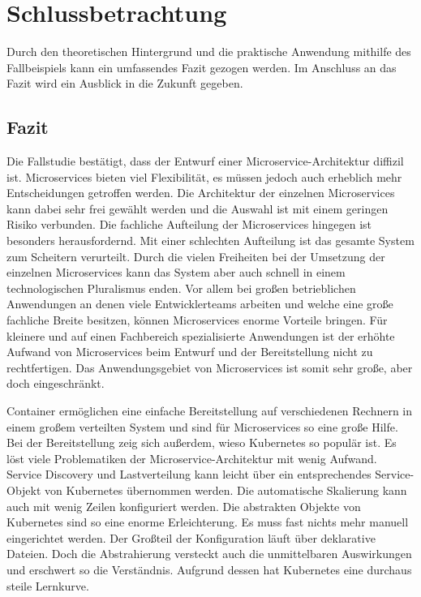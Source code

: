 \section{Schlussbetrachtung}

Durch den theoretischen Hintergrund und die praktische Anwendung mithilfe des Fallbeispiels kann ein umfassendes Fazit gezogen werden. Im Anschluss an das Fazit wird ein Ausblick in die Zukunft gegeben.

\subsection{Fazit}
Die Fallstudie bestätigt, dass der Entwurf einer Microservice-Architektur diffizil ist. Microservices bieten viel Flexibilität, es müssen jedoch auch erheblich mehr Entscheidungen getroffen werden. Die Architektur der einzelnen Microservices kann dabei sehr frei gewählt werden und die Auswahl ist mit einem geringen Risiko verbunden. Die fachliche Aufteilung der Microservices hingegen ist besonders herausfordernd. Mit einer schlechten Aufteilung ist das gesamte System zum Scheitern verurteilt. Durch die vielen Freiheiten bei der Umsetzung der einzelnen Microservices kann das System aber auch schnell in einem technologischen Pluralismus enden. Vor allem bei großen betrieblichen Anwendungen an denen viele Entwicklerteams arbeiten und welche eine große fachliche Breite besitzen, können Microservices enorme Vorteile bringen. Für kleinere und auf einen Fachbereich spezialisierte Anwendungen ist der erhöhte Aufwand von Microservices beim Entwurf und der Bereitstellung nicht zu rechtfertigen. Das Anwendungsgebiet von Microservices ist somit sehr große, aber doch eingeschränkt.

Container ermöglichen eine einfache Bereitstellung auf verschiedenen Rechnern in einem großem verteilten System und sind für Microservices so eine große Hilfe. Bei der Bereitstellung zeig sich außerdem, wieso Kubernetes so populär ist. Es löst viele Problematiken der Microservice-Architektur mit wenig Aufwand. Service Discovery und Lastverteilung kann leicht über ein entsprechendes Service-Objekt von Kubernetes übernommen werden. Die automatische Skalierung kann auch mit wenig Zeilen konfiguriert werden. Die abstrakten Objekte von Kubernetes sind so eine enorme Erleichterung. Es muss fast nichts mehr manuell eingerichtet werden. Der Großteil der Konfiguration läuft über deklarative Dateien. Doch die Abstrahierung versteckt auch die unmittelbaren Auswirkungen und erschwert so die Verständnis. Aufgrund dessen hat Kubernetes eine durchaus steile Lernkurve.


